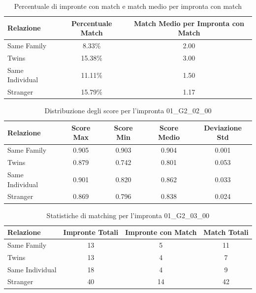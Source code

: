 \begin{table}[htbp]
\centering
\caption{Percentuale di impronte con match e match medio per impronta con match}
\label{tab:match_percentage_01_G2_02_00}
\begin{tabular}{|l|c|c|}
\hline
\textbf{Relazione} & \textbf{Percentuale Match} & \textbf{Match Medio per Impronta con Match} \\
\hline
Same Family & 8.33\% & 2.00 \\
\hline
Twins & 15.38\% & 3.00 \\
\hline
Same Individual & 11.11\% & 1.50 \\
\hline
Stranger & 15.79\% & 1.17 \\
\hline
\end{tabular}
\end{table}


\begin{table}[htbp]
\centering
\caption{Distribuzione degli score per l'impronta 01\_G2\_02\_00}
\label{tab:scores_01_G2_02_00}
\begin{tabular}{|l|c|c|c|c|}
\hline
\textbf{Relazione} & \textbf{Score Max} & \textbf{Score Min} & \textbf{Score Medio} & \textbf{Deviazione Std} \\
\hline
Same Family & 0.905 & 0.903 & 0.904 & 0.001 \\
\hline
Twins & 0.879 & 0.742 & 0.801 & 0.053 \\
\hline
Same Individual & 0.901 & 0.820 & 0.862 & 0.033 \\
\hline
Stranger & 0.869 & 0.796 & 0.838 & 0.024 \\
\hline
\end{tabular}
\end{table}


\begin{table}[htbp]
\centering
\caption{Statistiche di matching per l'impronta 01\_G2\_03\_00}
\label{tab:results_01_G2_03_00}
\begin{tabular}{|l|c|c|c|}
\hline
\textbf{Relazione} & \textbf{Impronte Totali} & \textbf{Impronte con Match} & \textbf{Match Totali} \\
\hline
Same Family & 13 & 5 & 11 \\
\hline
Twins & 13 & 4 & 7 \\
\hline
Same Individual & 18 & 4 & 9 \\
\hline
Stranger & 40 & 14 & 42 \\
\hline
\end{tabular}
\end{table}


